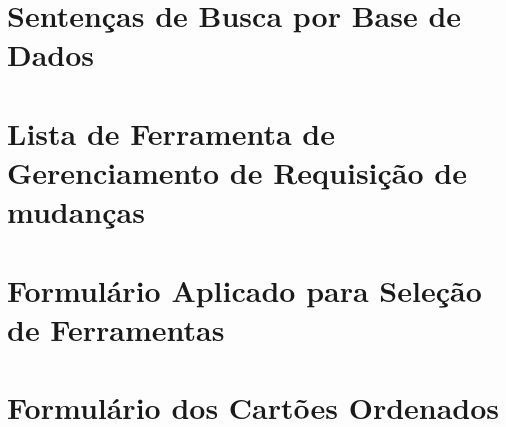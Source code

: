 \begin{appendices}

	\chapter{Sentenças de Busca por Base de Dados}
	 \label{ch:app-instrumentos-mapeamento}
	 

	 \chapter{Lista de Ferramenta de Gerenciamento de Requisição de mudanças}
	 \label{ch:app-lista-fgrm}
	 

	 \chapter{Formulário Aplicado para Seleção de Ferramentas}
	 \label{ch:app-form-selecao-ferramentas}
	

	 \chapter{Formulário dos Cartões Ordenados}
	 \label{ch:app-form-cartoes-ordenados}
	 
\end{appendices}